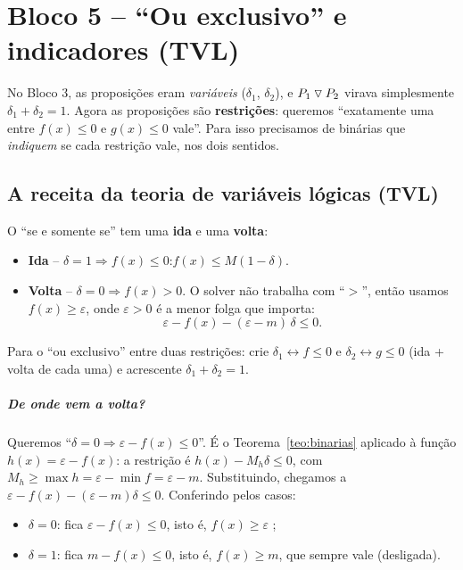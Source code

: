 \chapter{Bloco 5 -- ``Ou exclusivo'' e indicadores (TVL)}
\label{cap:bloco5}

No Bloco 3, as proposições eram \emph{variáveis} ($\delta_1$, $\delta_2$), e $P_1\mathbin{\triangledown} P_2$ virava simplesmente
$\delta_1+\delta_2=1$. Agora as proposições são \textbf{restrições}: queremos ``exatamente uma entre $f(x)\le0$ e
$g(x)\le0$ vale''. Para isso precisamos de binárias que \emph{indiquem} se cada restrição vale, nos dois sentidos.

\section{A receita da teoria de variáveis lógicas (TVL)}

\begin{receita}
O ``se e somente se'' tem uma \textbf{ida} e uma \textbf{volta}:
\begin{itemize}
  \item \textbf{Ida} -- $\delta=1\Rightarrow f(x)\le0$:\qquad $f(x)\le M(1-\delta)$.
  \item \textbf{Volta} -- $\delta=0\Rightarrow f(x)>0$. O solver não trabalha com ``$>$'', então usamos
  $f(x)\ge\varepsilon$, onde $\varepsilon>0$ é a menor folga que importa:
  \[
  \varepsilon - f(x) - (\varepsilon - m)\,\delta \le 0 .
  \]
\end{itemize}
Para o ``ou exclusivo'' entre duas restrições: crie $\delta_1\leftrightarrow f\le0$ e $\delta_2\leftrightarrow g\le0$
(ida + volta de cada uma) e acrescente $\delta_1+\delta_2=1$.
\end{receita}

\paragraph{De onde vem a volta?} Queremos ``$\delta=0\Rightarrow \varepsilon-f(x)\le0$''. É o
Teorema~\ref{teo:binarias} aplicado à função $h(x)=\varepsilon-f(x)$: a restrição é $h(x)-M_h\delta\le0$, com
$M_h\ge\max h=\varepsilon-\min f=\varepsilon-m$. Substituindo, chegamos a
$\varepsilon-f(x)-(\varepsilon-m)\delta\le0$. Conferindo pelos casos:
\begin{itemize}
  \item $\delta=0$: fica $\varepsilon-f(x)\le0$, isto é, $f(x)\ge\varepsilon$ \checkmark;
  \item $\delta=1$: fica $m-f(x)\le0$, isto é, $f(x)\ge m$, que sempre vale \checkmark (desligada).
\end{itemize}

